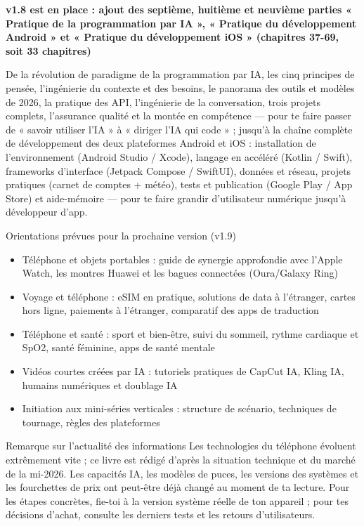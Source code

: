 

\textbf{v1.8 est en place : ajout des septième, huitième et neuvième parties « Pratique de la programmation par IA », « Pratique du développement Android » et « Pratique du développement iOS » (chapitres 37-69, soit 33 chapitres)}\par

De la révolution de paradigme de la programmation par IA, les cinq principes de pensée, l'ingénierie du contexte et des besoins, le panorama des outils et modèles de 2026, la pratique des API, l'ingénierie de la conversation, trois projets complets, l'assurance qualité et la montée en compétence — pour te faire passer de « savoir utiliser l'IA » à « diriger l'IA qui code » ; jusqu'à la chaîne complète de développement des deux plateformes Android et iOS : installation de l'environnement (Android Studio / Xcode), langage en accéléré (Kotlin / Swift), frameworks d'interface (Jetpack Compose / SwiftUI), données et réseau, projets pratiques (carnet de comptes + météo), tests et publication (Google Play / App Store) et aide-mémoire — pour te faire grandir d'utilisateur numérique jusqu'à développeur d'app.

\begin{tcbinfo}{Orientations prévues pour la prochaine version (v1.9)}
\begin{itemize}
  \item Téléphone et objets portables : guide de synergie approfondie avec l'Apple Watch, les montres Huawei et les bagues connectées (Oura/Galaxy Ring)
  \item Voyage et téléphone : eSIM en pratique, solutions de data à l'étranger, cartes hors ligne, paiements à l'étranger, comparatif des apps de traduction
  \item Téléphone et santé : sport et bien-être, suivi du sommeil, rythme cardiaque et SpO2, santé féminine, apps de santé mentale
  \item Vidéos courtes créées par IA : tutoriels pratiques de CapCut IA, Kling IA, humains numériques et doublage IA
  \item Initiation aux mini-séries verticales : structure de scénario, techniques de tournage, règles des plateformes
\end{itemize}

\end{tcbinfo}

\begin{tcbwarn}{Remarque sur l'actualité des informations}
Les technologies du téléphone évoluent extrêmement vite ; ce livre est rédigé d'après la situation technique et du marché de la mi-2026. Les capacités IA, les modèles de puces, les versions des systèmes et les fourchettes de prix ont peut-être déjà changé au moment de ta lecture. Pour les étapes concrètes, fie-toi à la version système réelle de ton appareil ; pour tes décisions d'achat, consulte les derniers tests et les retours d'utilisateurs.

\end{tcbwarn}
